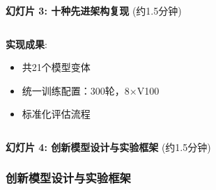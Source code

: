 \documentclass[10pt]{beamer}
\begin{document}
\begin{frame}{\textbf{幻灯片 3: 十种先进架构复现} (约1.5分钟)}
{\begin{columns}[T]
\begin{column}{0.5\textwidth}
        \vspace{0.2em}
        \textbf{实现成果}:
        \begin{itemize}
            \item 共21个模型变体
            \item 统一训练配置：300轮，8×V100
            \item 标准化评估流程
        \end{itemize}
    \end{column}
\end{columns}
}

\end{frame}

\begin{frame}{\textbf{幻灯片 4: 创新模型设计与实验框架} (约1.5分钟)}
\frametitle{创新模型设计与实验框架}


\end{frame}
\end{document}

